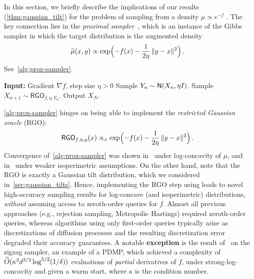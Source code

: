 In this section, we briefly describe the implications of our results (\cref{thm:gaussian_tilt}) for the problem of sampling from a density $\mu \propto e^{-f}$ .
The key connection lies in the \emph{proximal sampler}~\citep{LeeSheTia21RGO, Chen+22ProxSampler}, which is an instance of the Gibbs sampler in which the target distribution is the augmented density
\begin{align*}
    \wt\mu(x,y)\propto \exp\prn[\Big]{-f(x) - \frac{1}{2\eta}\,\nrm{y-x}^2}\,.
\end{align*}
See~\cref{alg:prox-sampler}.

\begin{algorithm}
\caption{Proximal sampler}\label{alg:prox-sampler}
\begin{algorithmic}
\STATE \textbf{Input:} Gradient $\nabla f$, step size $\eta > 0$
\STATE Sample $Y_n \sim \normal{X_n, \eta I}$.
\STATE Sample $X_{n+1}\sim \mathsf{RGO}_{f,\eta,Y_n}$.
\ENDFOR
\STATE Output $X_N$.
\end{algorithmic}
\end{algorithm}

\cref{alg:prox-sampler} hinges on being able to implement the \emph{restricted Gaussian oracle} (RGO):
\begin{align*}
    \mathsf{RGO}_{f,\eta,y}(x)     \propto_x \exp\prn[\Big]{-f(x) - \frac{1}{2\eta}\,\nrm{y-x}^2}\,.
\end{align*}
Convergence of~\cref{alg:prox-sampler} was shown in~\citet{LeeSheTia21RGO} under log-concavity of $\mu$,
and in~\citet{Chen+22ProxSampler} under weaker isoperimetric assumptions.
On the other hand, note that the RGO is exactly a Gaussian tilt distribution, which we considered in~\cref{sec:gaussian_tilts}.
Hence, implementing the RGO step using \AlgWSC{} leads to novel high-accuracy sampling results for log-concave (and isoperimetric) distributions, \emph{without} assuming access to zeroth-order queries for $f$.
Almost all previous approaches (e.g., rejection sampling, Metropolis--Hastings) required zeroth-order queries, whereas algorithms using only first-order queries typically arise as discretizations of diffusion processes and the resulting discretization error degraded their accuracy guarantees.
A notable \textbf{exception} is the result of~\citet{LuWan22Zigzag} on the zigzag sampler, an example of a PDMP\@, which achieved a complexity of $\wt O(\kappa^2 d^{3/2} \log^{5/2}(1/\delta))$ evaluations of \emph{partial} derivatives of $f$, under strong-log-concavity and given a warm start, where $\kappa$ is the condition number. %

